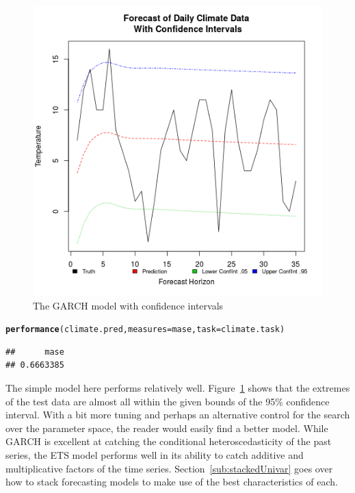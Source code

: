 \documentclass[12pt]{article}\usepackage[]{graphicx}\usepackage[]{color}
\makeatletter
\newcommand{\hlstd}[1]{\textcolor[rgb]{0.345,0.345,0.345}{#1}}%
\newcommand{\hlkwc}[1]{\textcolor[rgb]{0.333,0.667,0.333}{#1}}%
\newcommand{\hlkwd}[1]{\textcolor[rgb]{0.737,0.353,0.396}{\textbf{#1}}}%
\newenvironment{kframe}{%
 \def\at@end@of@kframe{}%
 \ifinner\ifhmode%
  \def\at@end@of@kframe{\end{minipage}}%
  \begin{minipage}{\columnwidth}%
 \fi\fi%
 \def\FrameCommand##1{\hskip\@totalleftmargin \hskip-\fboxsep
 \colorbox{shadecolor}{##1}\hskip-\fboxsep
     \hskip-\linewidth \hskip-\@totalleftmargin \hskip\columnwidth}%
 \MakeFramed {\advance\hsize-\width
   \@totalleftmargin\z@ \linewidth\hsize
   \@setminipage}}%
 {\par\unskip\endMakeFramed%
 \at@end@of@kframe}
\newenvironment{knitrout}{}{} %
\theoremstyle{definition}
\makeatother
\begin{document}
\begin{figure}[h!]
\includegraphics[width=\linewidth]{plot_garch_final.png}
\centering
\caption{The GARCH model with confidence intervals}
\label{fig:garch_final}
\end{figure}

\begin{knitrout}
\color{fgcolor}\begin{kframe}
\begin{alltt}
\hlkwd{performance}\hlstd{(climate.pred,} \hlkwc{measures} \hlstd{= mase,} \hlkwc{task} \hlstd{= climate.task)}
\end{alltt}
\begin{verbatim}
##      mase 
## 0.6663385
\end{verbatim}
\end{kframe}
\end{knitrout}

\doublespacing

The simple model here performs relatively well. Figure~\ref{fig:garch_final} shows that the extremes of the test data are almost all within the given bounds of the 95\% confidence interval. With a bit more tuning and perhaps an alternative control for the search over the parameter space, the reader would easily find a better model. While GARCH is excellent at catching the conditional heteroscedasticity of the past series, the ETS model performs well in its ability to catch additive and multiplicative factors of the time series. Section~\ref{sub:stackedUnivar} goes over how to stack forecasting models to make use of the best characteristics of each.
\end{document}
